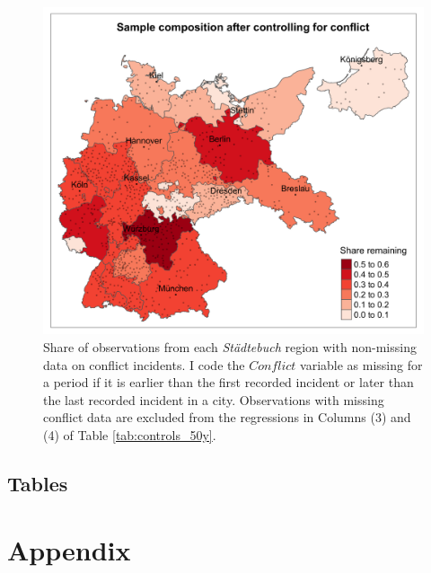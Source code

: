 \documentclass[11pt, a4paper]{article}
\begin{document}
\begin{figure}[ht]
    \centering
    \includegraphics[scale = 0.15]{paper/output/descriptive/map_conflict_NA_50y.png}
    \caption{Share of observations from each \textit{Städtebuch} region with non-missing data on conflict incidents. I code the $Conflict$ variable as missing for a period if it is earlier than the first recorded incident or later than the last recorded incident in a city. Observations with missing conflict data are excluded from the regressions in Columns (3) and (4) of Table \ref{tab:controls_50y}.}
    \label{fig:conflict_map}
\end{figure}

\clearpage
\subsection*{Tables}







\section*{Appendix}
\end{document}
